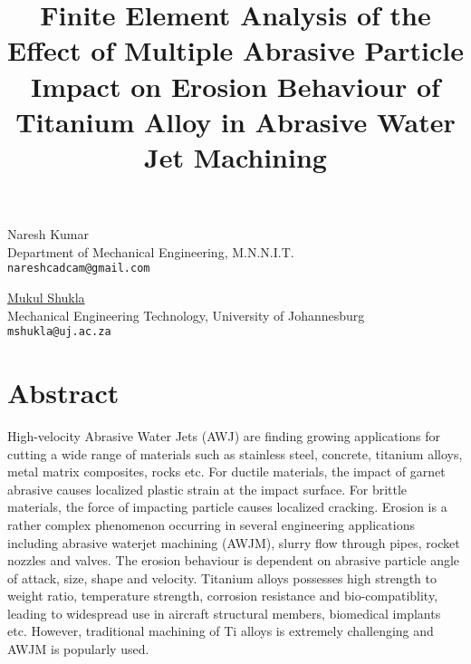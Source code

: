 \title{Finite Element Analysis of the Effect of Multiple Abrasive Particle Impact on Erosion Behaviour of Titanium Alloy in Abrasive Water Jet Machining}
\author{} \institute{}
\maketitle

\begin{center}
{\large Naresh Kumar}\\
Department of Mechanical Engineering, M.N.N.I.T.\\
{\tt nareshcadcam@gmail.com}\\
\vspace{4mm}

{\large \underline{Mukul Shukla}}\\
Mechanical Engineering Technology, University of Johannesburg\\
{\tt mshukla@uj.ac.za}
\end{center}

\section*{Abstract}
High-velocity Abrasive Water Jets (AWJ) are finding growing applications for cutting a wide range of materials such as stainless steel, concrete, titanium alloys, metal matrix composites, rocks etc. For ductile materials, the impact of garnet abrasive causes localized plastic strain at the impact surface. For brittle materials, the force of impacting particle causes localized cracking. Erosion is a rather complex phenomenon occurring in several engineering applications including abrasive waterjet machining (AWJM), slurry flow through pipes, rocket nozzles and valves. The erosion behaviour is dependent on abrasive particle angle of attack, size, shape and velocity. Titanium alloys possesses high strength to weight ratio, temperature strength, corrosion resistance and bio-compatiblity, leading to widespread use in aircraft structural members, biomedical implants etc. However, traditional machining of Ti alloys is extremely challenging and AWJM is popularly used.

